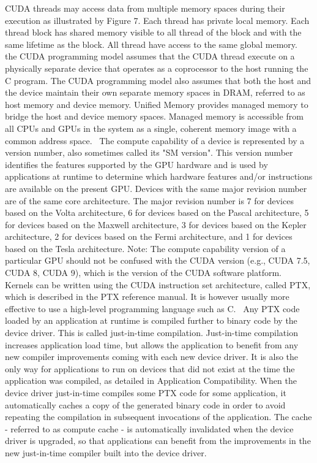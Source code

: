 \documentclass{article}
\begin{document}
CUDA threads may access data from multiple memory spaces during their execution as illustrated by Figure 7. Each thread has private local memory. Each thread block has shared memory visible to all thread of the block and with the same lifetime as the block. All thread have access to the same global memory.~\cite[p.~2.3]{CUDA18}
the CUDA programming model assumes that the CUDA thread execute on a physically separate device that operates as a coprocessor to the host running the C program. The CUDA programming model also assumes that both the host and the device maintain their own separate memory spaces in DRAM, referred to as host memory and device memory. Unified Memory provides managed memory to bridge the host and device memory spaces. Managed memory is accessible from all CPUs and GPUs in the system as a single, coherent memory image with a common address space.~\cite[p.~2.4]{CUDA18}
The compute capability of a device is represented by a version number, also sometimes called its "SM version". This version number identifies the features supported by the GPU hardware and is used by applications at runtime to determine which hardware features and/or instructions are available on the present GPU. Devices with the same major revision number are of the same core architecture. The major revision number is 7 for devices based on the Volta architecture, 6 for devices based on the Pascal architecture, 5 for devices based on the Maxwell architecture, 3 for devices based on the Kepler architecture, 2 for devices based on the Fermi architecture, and 1 for devices based on the Tesla architecture. Note: The compute capability version of a particular GPU should not be confused with the CUDA version (e.g., CUDA 7.5, CUDA 8, CUDA 9), which is the version of the CUDA software platform.~\cite[p.~2.4]{CUDA18}
Kernels can be written using the CUDA instruction set architecture, called PTX, which is described in the PTX reference manual. It is however usually more effective to use a high-level programming language such as C.~\cite[p.~3.1]{CUDA18}
Any PTX code loaded by an application at runtime is compiled further to binary code by the device driver. This is called just-in-time compilation. Just-in-time compilation increases application load time, but allows the application to benefit from any new compiler improvements coming with each new device driver. It is also the only way for applications to run on devices that did not exist at the time the application was compiled, as detailed in Application Compatibility. When the device driver just-in-time compiles some PTX code for some application, it automatically caches a copy of the generated binary code in order to avoid repeating the compilation in subsequent invocations of the application. The cache - referred to as compute cache - is automatically invalidated when the device driver is upgraded, so that applications can benefit from the improvements in the new just-in-time compiler built into the device driver.~\cite[p.~3.1.1.2]{CUDA18}
\end{document}
